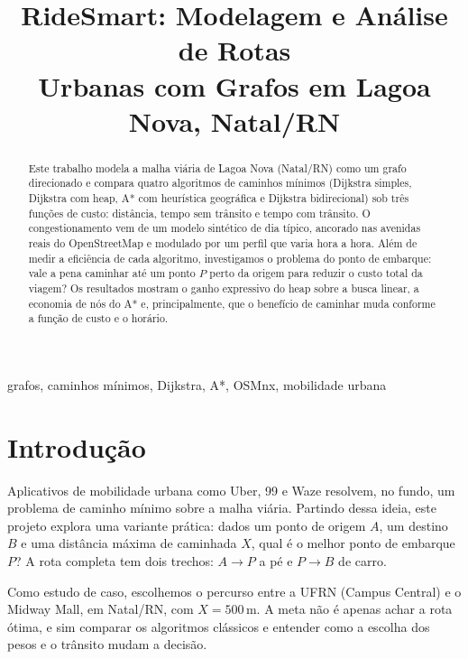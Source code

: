 \documentclass[conference]{IEEEtran}
\begin{document}
\title{RideSmart: Modelagem e Análise de Rotas\\ Urbanas com Grafos em Lagoa Nova, Natal/RN}

\author{
}

\maketitle

\begin{abstract}
Este trabalho modela a malha viária de Lagoa Nova (Natal/RN) como um grafo
direcionado e compara quatro algoritmos de caminhos mínimos (Dijkstra simples,
Dijkstra com heap, A* com heurística geográfica e Dijkstra bidirecional) sob três
funções de custo: distância, tempo sem trânsito e tempo com trânsito. O
congestionamento vem de um modelo sintético de dia típico, ancorado nas
avenidas reais do OpenStreetMap e modulado por um perfil que varia hora a hora. Além
de medir a eficiência de cada algoritmo, investigamos o problema do ponto de
embarque: vale a pena caminhar até um ponto $P$ perto da origem para reduzir o custo
total da viagem? Os resultados mostram o ganho expressivo do heap sobre a busca
linear, a economia de nós do A* e, principalmente, que o benefício de caminhar muda
conforme a função de custo e o horário.
\end{abstract}

\begin{IEEEkeywords}
grafos, caminhos mínimos, Dijkstra, A*, OSMnx, mobilidade urbana
\end{IEEEkeywords}

\section{Introdução}
Aplicativos de mobilidade urbana como Uber, 99 e Waze resolvem, no fundo, um problema
de caminho mínimo sobre a malha viária. Partindo dessa ideia, este projeto explora uma
variante prática: dados um ponto de origem $A$, um destino $B$ e uma distância máxima
de caminhada $X$, qual é o melhor ponto de embarque $P$? A rota completa tem dois
trechos: $A \rightarrow P$ a pé e $P \rightarrow B$ de carro.

Como estudo de caso, escolhemos o percurso entre a UFRN (Campus Central) e o
Midway Mall, em Natal/RN, com $X = 500$\,m. A meta não é apenas achar a rota
ótima, e sim comparar os algoritmos clássicos e entender como a escolha dos pesos e o
trânsito mudam a decisão.
\end{document}

